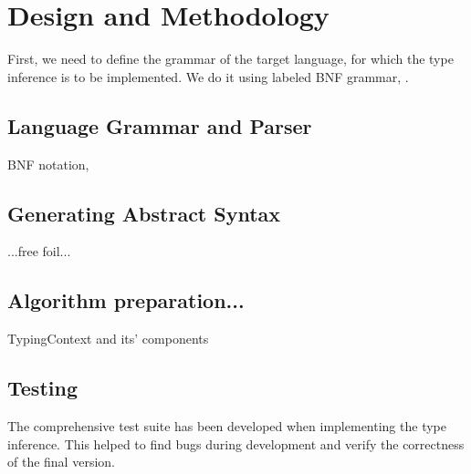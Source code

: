 \chapter{Design and Methodology}
\label{chap:methodology}






First, we need to define the grammar of the target language, for which the type inference is to be implemented. We do it using labeled BNF grammar, .

\section{Language Grammar and Parser}

BNF notation, 

\section{Generating Abstract Syntax}

...free foil...

\section{Algorithm preparation...}

TypingContext and its' components

\section{Testing}

The comprehensive test suite has been developed when implementing the type inference. This helped to find bugs during development and verify the correctness of the final version.
